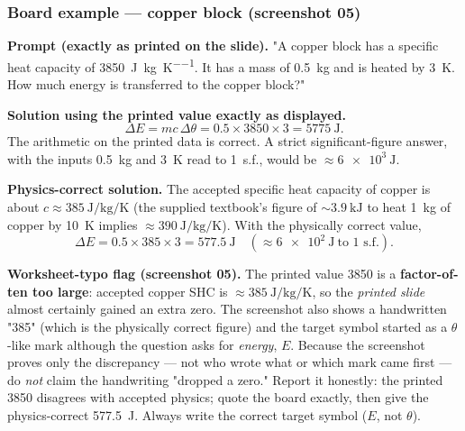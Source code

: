 \documentclass[11pt,a4paper]{article}
\newcommand{\dtheta}{\Delta\theta}
\newcommand{\dE}{\Delta E}
\begin{document}
\subsubsection*{Board example --- copper block (screenshot 05)}
\begin{plainbox}
\textbf{Prompt (exactly as printed on the slide).} "A copper block has a specific heat
capacity of \SI{3850}{\joule\per\kilogram\per\kelvin}. It has a mass of \SI{0.5}{\kilogram}
and is heated by \SI{3}{\kelvin}. How much energy is transferred to the copper block?"

\smallskip
\textbf{Solution using the printed value exactly as displayed.}
\[
\dE = mc\,\dtheta = 0.5 \times 3850 \times 3 = \SI{5775}{\joule} .
\]
The arithmetic on the printed data is correct. A strict significant-figure answer, with the
inputs \SI{0.5}{\kilogram} and \SI{3}{\kelvin} read to 1~s.f., would be
$\approx\SI{6e3}{\joule}$.

\smallskip
\textbf{Physics-correct solution.} The accepted specific heat capacity of copper is about
$c \approx \SI{385}{\joule\per\kilogram\per\kelvin}$ (the supplied textbook's figure of
$\sim\SI{3.9}{\kilo\joule}$ to heat \SI{1}{\kilogram} of copper by \SI{10}{\kelvin} implies
$\approx\SI{390}{\joule\per\kilogram\per\kelvin}$). With the physically correct value,
\[
\dE = 0.5 \times 385 \times 3 = \SI{577.5}{\joule}\quad(\approx\SI{6e2}{\joule}\ \text{to 1 s.f.}).
\]
\end{plainbox}
\begin{watchbox}
\textbf{Worksheet-typo flag (screenshot 05).} The printed value \SI{3850}{} is a
\textbf{factor-of-ten too large}: accepted copper SHC is $\approx\SI{385}{\joule\per\kilogram\per\kelvin}$,
so the \emph{printed slide} almost certainly gained an extra zero. The screenshot also shows
a handwritten "385" (which is the physically correct figure) and the target symbol started
as a $\theta$-like mark although the question asks for \emph{energy}, $E$. Because the
screenshot proves only the discrepancy --- not who wrote what or which mark came first --- do
\emph{not} claim the handwriting "dropped a zero." Report it honestly: the printed
\SI{3850}{} disagrees with accepted physics; quote the board exactly, then give the
physics-correct \SI{577.5}{\joule}. Always write the correct target symbol ($E$, not
$\theta$).
\end{watchbox}
\end{document}
